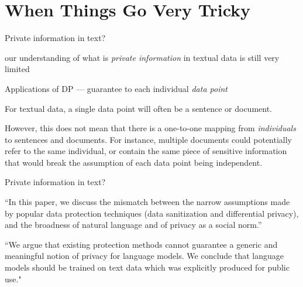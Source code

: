 \documentclass[12pt,aspectratio=169,handout]{beamer}
\begin{document}
\section{When Things Go Very Tricky}


\begin{frame}{Private information in text?}


our understanding of what is \textit{private information} in textual data is still very limited

Applications of DP --- guarantee to each individual \textit{data point}

For textual data, a single data point will often be a sentence or document.

However, this does not mean that there is a one-to-one mapping from \textit{individuals} to sentences and documents.
For instance, multiple documents could potentially refer to the same individual, or contain the same piece of sensitive information that would break the assumption of each data point being independent.


\end{frame}


\begin{frame}{Private information in text?}


``In this paper, we discuss the mismatch between the narrow assumptions made by popular data protection techniques (data sanitization and differential privacy), and the broadness of natural language and of privacy as a social norm.''


``We argue that existing protection methods cannot guarantee a generic and meaningful notion of privacy for language models. We conclude that language models should be trained on text data which was explicitly produced for public use."


\end{frame}
\end{document}
